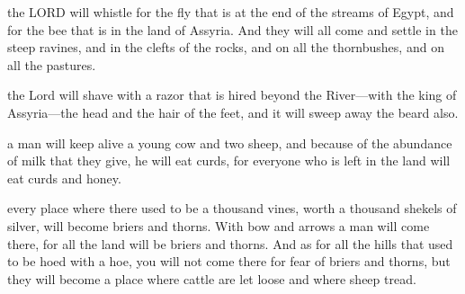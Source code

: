 \documentclass[11pt]{article}
\begin{document}
\begin{biblicaloutline}[Isaiah 7:18-25]

    
    \begin{versesection}{2em}
          the LORD will whistle for the fly that is at the end of the streams of Egypt, and for the bee that is in the land of Assyria.  And they will all come and settle in the steep ravines, and in the clefts of the rocks, and on all the thornbushes, and on all the pastures.
        
          the Lord will shave with a razor that is hired beyond the River—with the king of Assyria—the head and the hair of the feet, and it will sweep away the beard also.
    \end{versesection}
    
    
    \begin{versesection}{2em}
          a man will keep alive a young cow and two sheep,  and because of the abundance of milk that they give, he will eat curds, for everyone who is left in the land will eat curds and honey.
        
          every place where there used to be a thousand vines, worth a thousand shekels of silver, will become briers and thorns.  With bow and arrows a man will come there, for all the land will be briers and thorns.  And as for all the hills that used to be hoed with a hoe, you will not come there for fear of briers and thorns, but they will become a place where cattle are let loose and where sheep tread.
    \end{versesection}

\end{biblicaloutline}
\end{document}
